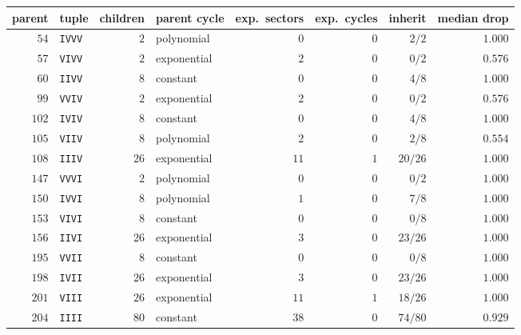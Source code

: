 \begin{tabular}{rlrlrrrr}
\hline
parent & tuple & children & parent cycle & exp.\ sectors & exp.\ cycles & inherit & median drop \\
\hline
$54$ & \texttt{IVVV} & $2$ & polynomial & $0$ & $0$ & $2/2$ & $1.000$ \\
$57$ & \texttt{VIVV} & $2$ & exponential & $2$ & $0$ & $0/2$ & $0.576$ \\
$60$ & \texttt{IIVV} & $8$ & constant & $0$ & $0$ & $4/8$ & $1.000$ \\
$99$ & \texttt{VVIV} & $2$ & exponential & $2$ & $0$ & $0/2$ & $0.576$ \\
$102$ & \texttt{IVIV} & $8$ & constant & $0$ & $0$ & $4/8$ & $1.000$ \\
$105$ & \texttt{VIIV} & $8$ & polynomial & $2$ & $0$ & $2/8$ & $0.554$ \\
$108$ & \texttt{IIIV} & $26$ & exponential & $11$ & $1$ & $20/26$ & $1.000$ \\
$147$ & \texttt{VVVI} & $2$ & polynomial & $0$ & $0$ & $0/2$ & $1.000$ \\
$150$ & \texttt{IVVI} & $8$ & polynomial & $1$ & $0$ & $7/8$ & $1.000$ \\
$153$ & \texttt{VIVI} & $8$ & constant & $0$ & $0$ & $0/8$ & $1.000$ \\
$156$ & \texttt{IIVI} & $26$ & exponential & $3$ & $0$ & $23/26$ & $1.000$ \\
$195$ & \texttt{VVII} & $8$ & constant & $0$ & $0$ & $0/8$ & $1.000$ \\
$198$ & \texttt{IVII} & $26$ & exponential & $3$ & $0$ & $23/26$ & $1.000$ \\
$201$ & \texttt{VIII} & $26$ & exponential & $11$ & $1$ & $18/26$ & $1.000$ \\
$204$ & \texttt{IIII} & $80$ & constant & $38$ & $0$ & $74/80$ & $0.929$ \\
\hline
\end{tabular}
